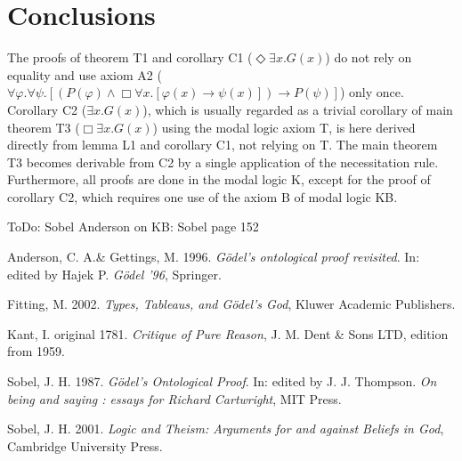 \documentclass{llncs}
\newcommand{\imp}{\rightarrow}
\newcommand{\all}{\forall}
\newcommand{\ex}{\exists}
\newcommand{\nec}{\Box} %
\newcommand{\pos}{\Diamond} %
\begin{document}


\section{Conclusions}

The proofs of theorem T1 and corollary C1 ($\pos \ex x. G(x)$) do not rely on equality and use axiom A2 ($\all \varphi. \all \psi.[(P(\varphi) \wedge \nec \all x.[\varphi(x) \imp \psi(x)]) \imp P(\psi)]$) only once. 
Corollary C2 ($\ex x. G(x)$), which is usually regarded as a trivial corollary of main theorem T3 ($\nec \ex x. G(x)$) using the modal logic axiom T, is here derived directly from lemma L1 and corollary C1, not relying on T. The main theorem T3 becomes derivable from C2 by a single application of the necessitation rule. Furthermore, all proofs are done in the modal logic K, except for the proof of corollary C2, which requires one use of the axiom B of modal logic KB.

ToDo: Sobel Anderson on KB: Sobel page 152

\begin{thebibliography}{9}


Anderson, C. A.\& Gettings, M. 1996.  {\itshape G\"odel's ontological proof revisited}. In: edited by Hajek P. {\itshape G\"odel '96},  Springer. 


Fitting, M. 2002.  {\itshape Types, Tableaus, and G\"odel's God}, Kluwer Academic Publishers.  

Kant, I.  original 1781.   {\itshape Critique of Pure Reason}, J. M. Dent \& Sons LTD, edition from 1959.

Sobel, J. H. 1987. {\itshape G\"odel's Ontological Proof}. In: edited by J. J. Thompson. {\itshape On being and saying : essays for Richard Cartwright},  MIT Press. 

Sobel, J. H. 2001. {\itshape Logic and Theism: Arguments for and against Beliefs in God}, Cambridge University Press. 



\end{thebibliography}
\end{document}
